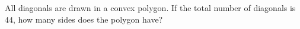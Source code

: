 All diagonals are drawn in a convex polygon. If the total number of diagonals is $44$, how many sides does the polygon have?
